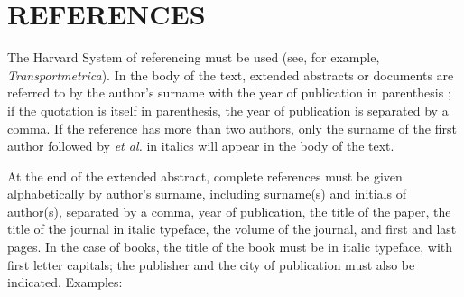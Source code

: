 \documentclass[a4paper,twoside,11pt]{article}
\begin{document}
\section{ REFERENCES}

The Harvard System of referencing must be used (see, for example, \textit{Transportmetrica}).  In the body of the text, extended abstracts or documents are referred to by the author's surname with the year of publication in parenthesis \citep{beckmann1956studies}; if the quotation is itself in parenthesis, the year of publication is separated by a comma.  If the reference has more than two authors, only the surname of the first author followed by \textit{et al.} in italics will appear in the body of the text.

At the end of the extended abstract, complete references must be given alphabetically by author's surname, including surname(s) and initials of author(s), separated by a comma, year of publication, the title of the paper, the title of the journal in italic typeface, the volume of the journal, and first and last pages.  In the case of books, the title of the book must be in italic typeface, with first letter capitals; the publisher and the city of publication must also be indicated. Examples:



\begin{small}
\begin{sloppypar} 
 

\setlength{\bibsep}{0pt}



\end{sloppypar}
\end{small}


\end{document}
